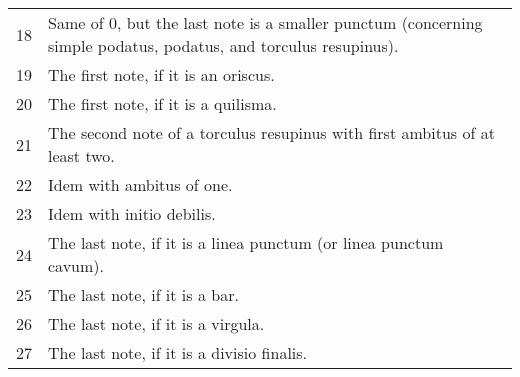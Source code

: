\begin{tabular}{cp{}}
  18 & Same of 0, but the last note is a smaller punctum (concerning simple podatus, podatus, and torculus resupinus).\\
  19 & The first note, if it is an oriscus.\\
  20 & The first note, if it is a quilisma.\\
  21 & The second note of a torculus resupinus with first ambitus of at least two.\\
  22 & Idem with ambitus of one.\\
  23 & Idem with initio debilis.\\
  24 & The last note, if it is a linea punctum (or linea punctum cavum).\\
  25 & The last note, if it is a bar.\\
  26 & The last note, if it is a virgula.\\
  27 & The last note, if it is a divisio finalis.\\
\end{tabular}

